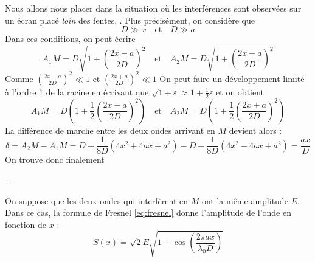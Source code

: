 \documentclass[MPSI]{cours}
\begin{document}
Nous allons nous placer dans la situation où les interférences sont observées sur un écran placé \textit{loin} des fentes, . Plus précisément, on considère que
\begin{equation}
  D \gg x \quad \text{et} \quad D \gg a
\end{equation}
Dans ces conditions, on peut écrire 
\begin{equation}
  A_1M  = D \sqrt{1+\left( \frac{2x-a}{2D} \right)^2 } \quad \text{et} \quad A_2M  = D \sqrt{1+\left( \frac{2x+a}{2D} \right)^2 }
\end{equation}
Comme $\left( \frac{2x-a}{2D} \right)^2 \ll 1$ et $\left( \frac{2x+a}{2D} \right)^2\ll 1$ On peut faire un développement limité à l'ordre 1 de la racine en écrivant que $\sqrt{1+\varepsilon} \approx 1+\frac{1}{2}\varepsilon$ et on obtient
\begin{equation}
  A_1M = D\left(1+\frac{1}{2}\left( \frac{2x-a}{2D} \right)^2\right) \quad \text{et} \quad A_2M = D\left(1+\frac{1}{2}\left( \frac{2x+a}{2D} \right)^2\right)
\end{equation}
La différence de marche entre les deux ondes arrivant en $M$ devient alors :
\begin{equation}
  \delta = A_2M - A_1M = D + \frac{1}{8D} \left( 4x^2 + 4ax + a^2 \right) -D -\frac{1}{8D} \left( 4x^2 - 4ax + a^2 \right) = \frac{ax}{D}
\end{equation}
On trouve donc finalement
\begin{eqencadre}
  \delta = 
\end{eqencadre}

On suppose que les deux ondes qui interfèrent en $M$ ont la même amplitude $E$.  Dans ce cas, la formule de Fresnel \eqref{eq:fresnel} donne l'amplitude de l'onde en fonction de $x$ :
\begin{equation}
  S(x) = \sqrt{2}E \sqrt{1 + \cos\left( \frac{2\pi ax}{\lambda_0D} \right) }
\end{equation}
\end{document}
